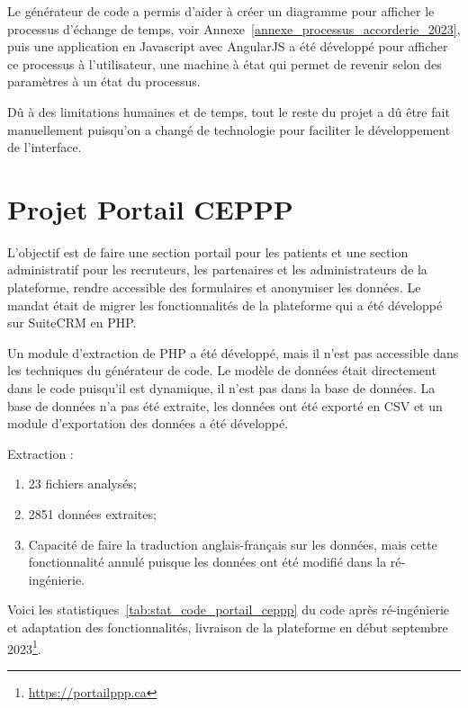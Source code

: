 Le générateur de code a permis d’aider à créer un diagramme pour afficher le processus d’échange de temps, voir Annexe~\ref{annexe_processus_accorderie_2023}, puis une application en Javascript avec AngularJS a été développé pour afficher ce processus à l’utilisateur, une machine à état qui permet de revenir selon des paramètres à un état du processus.

Dû à des limitations humaines et de temps, tout le reste du projet a dû être fait manuellement puisqu’on a changé de technologie pour faciliter le développement de l’interface.

\section{Projet Portail CEPPP}

L'objectif est de faire une section portail pour les patients et une section administratif pour les recruteurs, les partenaires et les administrateurs de la plateforme, rendre accessible des formulaires et anonymiser les données. Le mandat était de migrer les fonctionnalités de la plateforme qui a été développé sur SuiteCRM en PHP.

Un module d'extraction de PHP a été développé, mais il n'est pas accessible dans les techniques du générateur de code. Le modèle de données était directement dans le code puisqu'il est dynamique, il n'est pas dans la base de données. La base de données n'a pas été extraite, les données ont été exporté en CSV et un module d'exportation des données a été développé.

Extraction : 
\begin{enumerate}
    \item 23 fichiers analysés;
    \item 2851 données extraites;
    \item Capacité de faire la traduction anglais-français sur les données, mais cette fonctionnalité annulé puisque les données ont été modifié dans la ré-ingénierie.
\end{enumerate}

Voici les statistiques~\ref{tab:stat_code_portail_ceppp} du code après ré-ingénierie et adaptation des fonctionnalités, livraison de la plateforme en début septembre 2023\footnote{\url{https://portailppp.ca}}.


